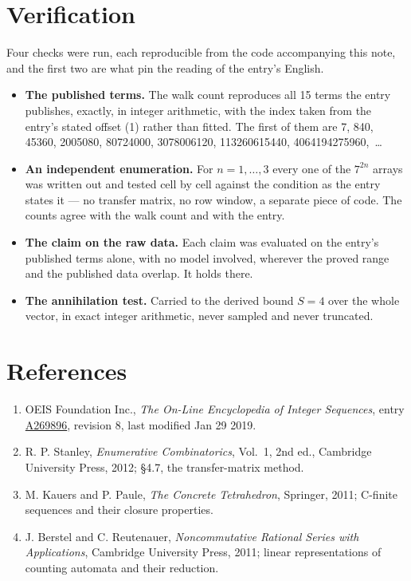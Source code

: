 \documentclass[11pt]{article}
\theoremstyle{definition}
\begin{document}
\section{Verification}

Four checks were run, each reproducible from the code accompanying this note, and the first two are what pin the reading of the entry's English.

\begin{itemize}

\item {\bfseries The published terms.} The walk count reproduces all 15 terms the entry publishes, exactly, in integer arithmetic, with the index taken from the entry's stated offset (1) rather than fitted. The first of them are 7, 840, 45360, 2005080, 80724000, 3078006120, 113260615440, 4064194275960,~\dots

\item {\bfseries An independent enumeration.} For $n = 1,\dots,3$ every one of the $7^{2n}$ arrays was written out and tested cell by cell against the condition as the entry states it --- no transfer matrix, no row window, a separate piece of code. The counts agree with the walk count and with the entry.

\item {\bfseries The claim on the raw data.} Each claim was evaluated on the entry's published terms alone, with no model involved, wherever the proved range and the published data overlap. It holds there.

\item {\bfseries The annihilation test.} Carried to the derived bound $S = 4$ over the whole vector, in exact integer arithmetic, never sampled and never truncated.

\end{itemize}

\section{References}

\begin{enumerate}

\item OEIS Foundation Inc., \emph{The On-Line Encyclopedia of Integer Sequences}, entry \href{https://oeis.org/A269896}{A269896}, revision 8, last modified Jan 29 2019.

\item R. P. Stanley, \emph{Enumerative Combinatorics}, Vol.~1, 2nd ed., Cambridge University Press, 2012; \S4.7, the transfer-matrix method.

\item M. Kauers and P. Paule, \emph{The Concrete Tetrahedron}, Springer, 2011; C-finite sequences and their closure properties.

\item J. Berstel and C. Reutenauer, \emph{Noncommutative Rational Series with Applications}, Cambridge University Press, 2011; linear representations of counting automata and their reduction.

\end{enumerate}
\end{document}
